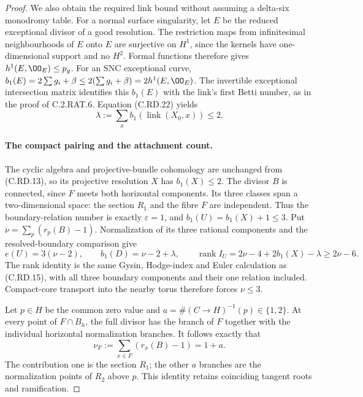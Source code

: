 \begin{proof}
We also obtain the required link bound without
assuming a delta-six monodromy table. For a
normal surface singularity, let $E$ be the
reduced exceptional divisor of a good resolution.
The restriction maps from infinitesimal
neighbourhoods of $E$ onto $E$ are surjective
on $H^1$, since the kernels have one-dimensional
support and no $H^2$. Formal functions therefore
gives $h^1(E,\OO_E)\le p_g$.
For an SNC exceptional curve,
$b_1(E)=2\sum g_i+\beta\le
2(\sum g_i+\beta)=2h^1(E,\OO_E)$.
The invertible exceptional intersection matrix
identifies this $b_1(E)$ with the link's first
Betti number, as in the proof of C.2.RAT.6.
Equation (C.RD.22) yields
\[
              \lambda:=\sum_x b_1(\operatorname{link}(X_0,x))
                            \le2.
\tag{C.RD.23}
\]

\paragraph{The compact pairing and the attachment count.}
The cyclic algebra and projective-bundle cohomology
are unchanged from (C.RD.13), so its projective
resolution $X$ has $b_1(X)\le2$.
The divisor $B$ is connected, since $F$ meets
both horizontal components. Its three classes
span a two-dimensional space: the section
$R_1$ and the fibre $F$ are independent.
Thus the boundary-relation number is exactly
$\varepsilon=1$, and $b_1(U)=b_1(X)+1\le3$.
Put $\nu=\sum_p(r_p(B)-1)$.
Normalization of its three rational components
and the resolved-boundary comparison give
\[
 e(U)=3(\nu-2),\qquad
 b_1(D)=\nu-2+\lambda,
 \qquad
 \operatorname{rank}I_U
       =2\nu-4+2b_1(X)-\lambda\ge2\nu-6.
\tag{C.RD.24}
\]
The rank identity is the same Gysin, Hodge-index
and Euler calculation as (C.RD.15), with all
three boundary components and their one relation
included. Compact-core transport into the
nearby torus therefore forces $\nu\le3$.

Let $p\in H$ be the common zero value and
$a=\#(C\to H)^{-1}(p)\in\{1,2\}$.
At every point of $F\cap B_h$, the full divisor
has the branch of $F$ together with the
individual horizontal normalization branches.
It follows exactly that
\[
        \nu_F:=\sum_{x\in F}(r_x(B)-1)=1+a.
\tag{C.RD.25}
\]
The contribution one is the section $R_1$;
the other $a$ branches are the normalization
points of $R_2$ above $p$. This identity retains
coinciding tangent roots and ramification.


\end{proof}
